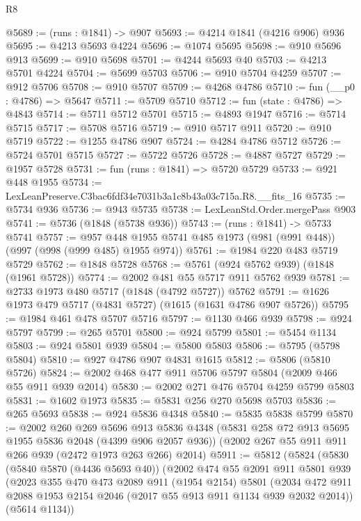 \begin{lexlean}{R8}
\begin{coremodule}
@5689 := (runs : @1841) -> @907
@5693 := @4214 @1841 (@4216 @906) @936
@5695 := @4213 @5693 @4224
@5696 := @1074 @5695
@5698 := @910 @5696 @913
@5699 := @910 @5698
@5701 := @4244 @5693 @40
@5703 := @4213 @5701 @4224
@5704 := @5699 @5703
@5706 := @910 @5704 @4259
@5707 := @912 @5706
@5708 := @910 @5707
@5709 := @4268 @4786
@5710 := fun (__p0 : @4786) => @5647
@5711 := @5709 @5710
@5712 := fun (state : @4786) => @4843
@5714 := @5711 @5712 @5701
@5715 := @4893 @1947
@5716 := @5714 @5715
@5717 := @5708 @5716
@5719 := @910 @5717 @911
@5720 := @910 @5719
@5722 := @1255 @4786 @907
@5724 := @4284 @4786 @5712
@5726 := @5724 @5701 @5715
@5727 := @5722 @5726
@5728 := @4887 @5727
@5729 := @1957 @5728
@5731 := fun (runs : @1841) => @5720 @5729
@5733 := @921 @448 @1955
@5734 := LexLeanPreserve.C3bac6fdf34e7031b3a1c8b43a03c715a.R8.__fits_16
@5735 := @5734 @936
@5736 := @943 @5735
@5738 := LexLeanStd.Order.mergePass @903
@5741 := @5736 (@1848 (@5738 @936))
@5743 := (runs : @1841) -> @5733 @5741
@5757 := @957 @448 @1955 @5741 @485 @1973 (@981 (@991 @448)) (@997 (@998 (@999 @485) @1955 @974))
@5761 := @1984 @220 @483 @5719 @5729
@5762 := @1848 @5728
@5768 := @5761 (@924 @5762 @939) (@1848 (@1961 @5728))
@5774 := @2002 @481 @55 @5717 @911 @5762 @939
@5781 := @2733 @1973 @480 @5717 (@1848 (@4792 @5727)) @5762
@5791 := @1626 @1973 @479 @5717 (@4831 @5727) (@1615 (@1631 @4786 @907 @5726))
@5795 := @1984 @461 @478 @5707 @5716
@5797 := @1130 @466 @939
@5798 := @924 @5797
@5799 := @265 @5701
@5800 := @924 @5799
@5801 := @5454 @1134
@5803 := @924 @5801 @939
@5804 := @5800 @5803
@5806 := @5795 (@5798 @5804)
@5810 := @927 @4786 @907 @4831 @1615
@5812 := @5806 (@5810 @5726)
@5824 := @2002 @468 @477 @911 @5706 @5797 @5804 (@2009 @466 @55 @911 @939 @2014)
@5830 := @2002 @271 @476 @5704 @4259 @5799 @5803
@5831 := @1602 @1973
@5835 := @5831 @256 @270 @5698 @5703
@5836 := @265 @5693
@5838 := @924 @5836 @4348
@5840 := @5835 @5838 @5799
@5870 := @2002
    @260
    @269
    @5696
    @913
    @5836
    @4348
    (@5831 @258 @72 @913 @5695 @1955 @5836 @2048 (@4399 @906 @2057 @936))
    (@2002 @267 @55 @911 @911 @266 @939 (@2472 @1973 @263 @266) @2014)
@5911 := @5812
    (@5824
      (@5830
        (@5840 @5870 (@4436 @5693 @40))
        (@2002
          @474
          @55
          @2091
          @911
          @5801
          @939
          (@2023
            @355
            @470
            @473
            @2089
            @911
            (@1954 @2154)
            @5801
            (@2034 @472 @911 @2088 @1953 @2154 @2046 (@2017 @55 @913 @911 @1134 @939 @2032 @2014))
            (@5614 @1134))

\end{coremodule}
\end{lexlean}
